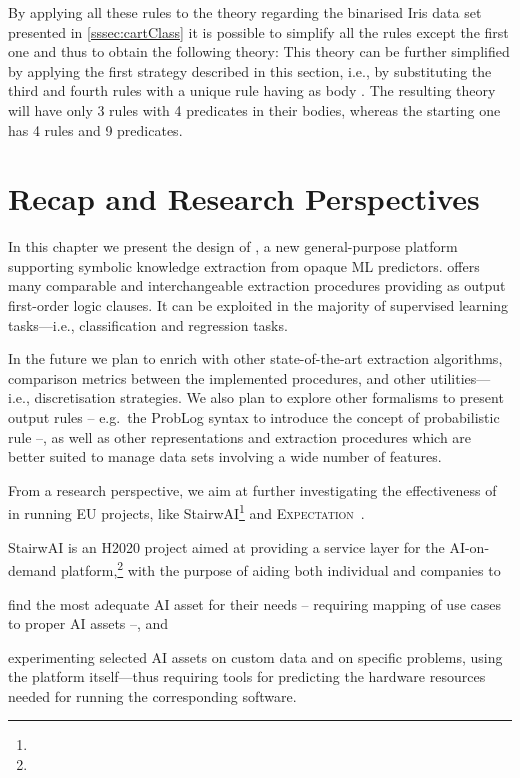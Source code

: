 \documentclass[12pt,a4paper,openright,twoside]{book}
\begin{document}
By applying all these rules to the theory regarding the binarised Iris data set presented in \cref{sssec:cartClass} it is possible to simplify all the rules except the first one and thus to obtain the following theory:
%
%
This theory can be further simplified by applying the first strategy described in this section, i.e., by substituting the third and fourth rules with a unique rule having as body .
%
The resulting theory will have only 3 rules with 4 predicates in their bodies, whereas the starting one has 4 rules and 9 predicates.

\section{Recap and Research Perspectives}\label{sec:conclusions2}

In this chapter we present the design of \psyke{}, a new general-purpose platform supporting symbolic knowledge extraction from opaque ML predictors.
%
\psyke{} offers many comparable and interchangeable extraction procedures providing as output first-order logic clauses.
%
It can be exploited in the majority of supervised learning tasks---i.e., classification and regression tasks.

In the future we plan to enrich \psyke{} with other state-of-the-art extraction algorithms, comparison metrics between the implemented procedures, and other utilities---i.e., discretisation strategies.
%
We also plan to explore other formalisms to present output rules -- e.g.\ the ProbLog syntax to introduce the concept of probabilistic rule --, as well as other representations and extraction procedures which are better suited to manage data sets involving a wide number of features.

From a research perspective, we aim at further investigating the effectiveness of \psyke{} in running EU projects, like StairwAI\footnote{} and \textsc{Expectation}~\cite{expectation-extraamas2021}.

StairwAI is an H2020 project aimed at providing a service layer for the AI-on-demand platform,\footnote{} with the purpose of aiding both individual and companies to
%
\begin{inlinelist}
    \item find the most adequate AI asset for their needs -- requiring mapping of use cases to proper AI assets --, and
    \item experimenting selected AI assets on custom data and on specific problems, using the platform itself---thus requiring tools for predicting the hardware resources needed for running the corresponding software.
\end{inlinelist}
\end{document}
